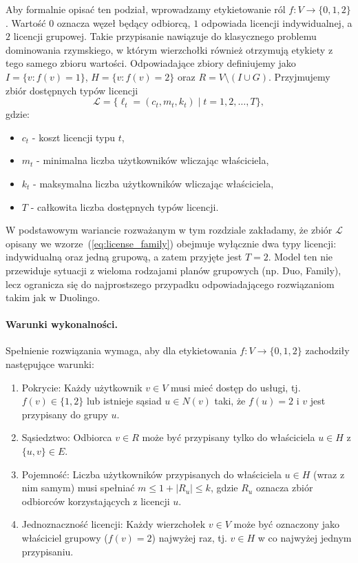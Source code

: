 Aby formalnie opisać ten podział, wprowadzamy etykietowanie ról $f:V\to\{0,1,2\}$.
Wartość $0$ oznacza węzeł będący odbiorcą, $1$ odpowiada licencji indywidualnej, a $2$ licencji grupowej.
Takie przypisanie nawiązuje do klasycznego problemu dominowania rzymskiego, w którym wierzchołki również otrzymują etykiety z tego samego zbioru wartości.
Odpowiadające zbiory definiujemy jako $I=\{v:f(v)=1\}$, $H=\{v:f(v)=2\}$ oraz $R=V\setminus(I\cup G)$.
Przyjmujemy zbiór dostępnych typów licencji
\begin{equation}
  \mathcal{L} = \{ \ell_t = (c_t, m_t, k_t) \mid t = 1,2,\dots,T \},
  \label{eq:license_family}
\end{equation}
gdzie:
\begin{itemize}
  \item $c_t$ - koszt licencji typu $t$,
  \item $m_t$ - minimalna liczba użytkowników wliczając właściciela,
  \item $k_t$ - maksymalna liczba użytkowników wliczając właściciela,
  \item $T$ - całkowita liczba dostępnych typów licencji.
\end{itemize}
W podstawowym wariancie rozważanym w tym rozdziale zakładamy, że zbiór $\mathcal{L}$ opisany we wzorze~(\ref{eq:license_family}) obejmuje wyłącznie dwa typy licencji: indywidualną oraz jedną grupową, a zatem przyjęte jest $T = 2$. Model ten nie przewiduje sytuacji z wieloma rodzajami planów grupowych (np. Duo, Family), lecz ogranicza się do najprostszego przypadku odpowiadającego rozwiązaniom takim jak w Duolingo.

\paragraph{Warunki wykonalności.}
Spełnienie rozwiązania wymaga, aby dla etykietowania $f:V\to\{0,1,2\}$ zachodziły następujące warunki:
\begin{enumerate}
  \item Pokrycie: Każdy użytkownik $v \in V$ musi mieć dostęp do usługi, tj. $f(v)\in\{1,2\}$ lub istnieje sąsiad $u\in N(v)$ taki, że $f(u)=2$ i $v$ jest przypisany do grupy $u$.
  \item Sąsiedztwo: Odbiorca $v\in R$ może być przypisany tylko do właściciela $u\in H$ z $\{u,v\}\in E$.
  \item Pojemność: Liczba użytkowników przypisanych do właściciela $u\in H$ (wraz z nim samym) musi spełniać $m \le 1+|R_u| \le k$, gdzie $R_u$ oznacza zbiór odbiorców korzystających z licencji $u$.
  \item Jednoznaczność licencji: Każdy wierzchołek $v\in V$ może być oznaczony jako właściciel grupowy ($f(v)=2$) najwyżej raz, tj. $v \in H$ w co najwyżej jednym przypisaniu.
\end{enumerate}


